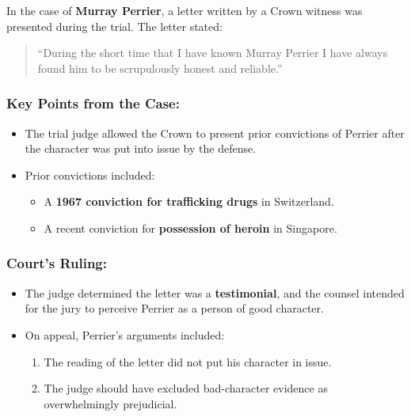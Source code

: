 In the case of \textbf{Murray Perrier}, a letter written by a Crown
witness was presented during the trial. The letter stated:

\begin{quote}
``During the short time that I have known Murray Perrier I have always
found him to be scrupulously honest and reliable.''
\end{quote}

\subsubsection{Key Points from the
Case:}\label{key-points-from-the-case}

\begin{itemize}
\tightlist
\item
  The trial judge allowed the Crown to present prior convictions of
  Perrier after the character was put into issue by the defense.
\item
  Prior convictions included:

  \begin{itemize}
  \tightlist
  \item
    A \textbf{1967 conviction for trafficking drugs} in Switzerland.
  \item
    A recent conviction for \textbf{possession of heroin} in Singapore.
  \end{itemize}
\end{itemize}

\subsubsection{Court's Ruling:}\label{courts-ruling}

\begin{itemize}
\tightlist
\item
  The judge determined the letter was a \textbf{testimonial}, and the
  counsel intended for the jury to perceive Perrier as a person of good
  character.
\item
  On appeal, Perrier's arguments included:

  \begin{enumerate}
  \def\labelenumi{\arabic{enumi}.}
  \tightlist
  \item
    The reading of the letter did not put his character in issue.
  \item
    The judge should have excluded bad-character evidence as
    overwhelmingly prejudicial.
  \end{enumerate}
\end{itemize}

